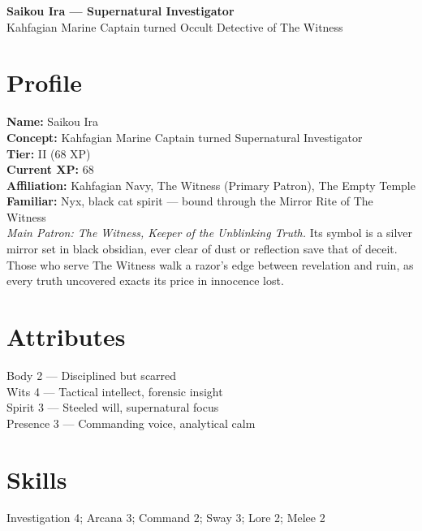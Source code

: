 \documentclass[11pt]{article}
\begin{document}
\begin{center}
{\LARGE \textbf{Saikou Ira — Supernatural Investigator}}\\[4pt]
{\large Kahfagian Marine Captain turned Occult Detective of The Witness}
\end{center}

\section*{Profile}
\textbf{Name:} Saikou Ira\\
\textbf{Concept:} Kahfagian Marine Captain turned Supernatural Investigator\\
\textbf{Tier:} II (68 XP)\\
\textbf{Current XP:} 68\\
\textbf{Affiliation:} Kahfagian Navy, The Witness (Primary Patron), The Empty Temple\\
\textbf{Familiar:} Nyx, black cat spirit — bound through the Mirror Rite of The Witness\\[6pt]
\emph{Main Patron: The Witness, Keeper of the Unblinking Truth.} Its symbol is a silver mirror set in black obsidian, ever clear of dust or reflection save that of deceit. Those who serve The Witness walk a razor’s edge between revelation and ruin, as every truth uncovered exacts its price in innocence lost.

\section*{Attributes}
Body 2 — Disciplined but scarred\\
Wits 4 — Tactical intellect, forensic insight\\
Spirit 3 — Steeled will, supernatural focus\\
Presence 3 — Commanding voice, analytical calm

\section*{Skills}
Investigation 4; Arcana 3; Command 2; Sway 3; Lore 2; Melee 2
\end{document}
